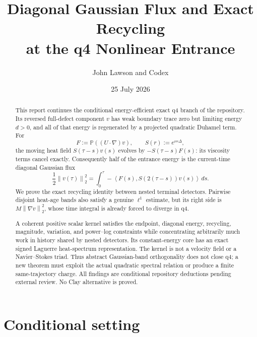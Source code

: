 \documentclass[11pt]{article}
\title{Diagonal Gaussian Flux and Exact Recycling\\
at the q4 Nonlinear Entrance}
\author{John Lawson and Codex}
\date{25 July 2026}
\theoremstyle{remark}
\newcommand{\Pp}{\mathbb P}
\newcommand{\norm}[1]{\left\|#1\right\|}
\newcommand{\ip}[2]{\left\langle #1,#2\right\rangle}
\begin{document}
\maketitle

\begin{abstract}
This report continues the conditional energy-efficient exact q4 branch
of the repository.  Its reversed full-defect component \(v\) has weak
boundary trace zero but limiting energy \(d>0\), and all of that energy
is regenerated by a projected quadratic Duhamel term.  For
\[
 F:=\Pp((U\cdot\nabla)v),\qquad S(r):=e^{\nu r\Delta},
\]
the moving heat field \(S(\tau-s)v(s)\) evolves by
\(-S(\tau-s)F(s)\): its viscosity terms cancel exactly.  Consequently
half of the entrance energy is the current-time diagonal Gaussian flux
\[
 \frac12\norm{v(\tau)}_2^2
 =
 \int_0^\tau-\ip{F(s)}{S(2(\tau-s))v(s)}\,ds.
\]
We prove the exact recycling identity between nested terminal
detectors.  Pairwise disjoint heat-age bands also satisfy a genuine
\(\ell^1\) estimate, but its right side is
\(M\norm{\nabla v}_2^2\), whose time integral is already forced to
diverge in q4.

A coherent positive scalar kernel satisfies the endpoint, diagonal
energy, recycling, magnitude, variation, and power--log constraints
while concentrating arbitrarily much work in history shared by nested
detectors.  Its constant-energy core has an exact signed Laguerre
heat-spectrum representation.  The kernel is not a velocity field or a
Navier--Stokes triad.  Thus abstract Gaussian-band orthogonality does
not close q4; a new theorem must exploit the actual quadratic spectral
relation or produce a finite same-trajectory charge.  All findings are
conditional repository deductions pending external review.  No Clay
alternative is proved.
\end{abstract}

\section{Conditional setting}
\end{document}
